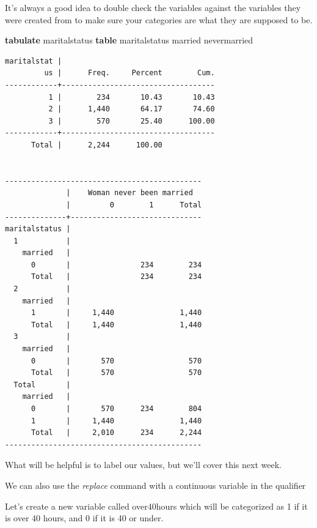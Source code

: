 \documentclass[
]{book}
\newenvironment{Shaded}{\begin{snugshade}}{\end{snugshade}}
\newcommand{\KeywordTok}[1]{\textcolor[rgb]{0.13,0.29,0.53}{\textbf{#1}}}
\newcommand{\NormalTok}[1]{#1}
\begin{document}
It's always a good idea to double check the variables against the variables they were created from to make sure your categories are what they are supposed to be.

\begin{Shaded}
\begin{Highlighting}[]
\KeywordTok{tabulate}\NormalTok{ maritalstatus}
\KeywordTok{table}\NormalTok{ maritalstatus married nevermarried}
\end{Highlighting}
\end{Shaded}

\begin{verbatim}
maritalstat |
         us |      Freq.     Percent        Cum.
------------+-----------------------------------
          1 |        234       10.43       10.43
          2 |      1,440       64.17       74.60
          3 |        570       25.40      100.00
------------+-----------------------------------
      Total |      2,244      100.00


---------------------------------------------
              |    Woman never been married  
              |         0        1      Total
--------------+------------------------------
maritalstatus |                              
  1           |                              
    married   |                              
      0       |                234        234
      Total   |                234        234
  2           |                              
    married   |                              
      1       |     1,440               1,440
      Total   |     1,440               1,440
  3           |                              
    married   |                              
      0       |       570                 570
      Total   |       570                 570
  Total       |                              
    married   |                              
      0       |       570      234        804
      1       |     1,440               1,440
      Total   |     2,010      234      2,244
---------------------------------------------
\end{verbatim}

What will be helpful is to label our values, but we'll cover this next week.

We can also use the \emph{replace} command with a continuous variable in the qualifier

Let's create a new variable called over40hours which will be categorized as 1 if it is over 40 hours, and 0 if it is 40 or under.
\end{document}
